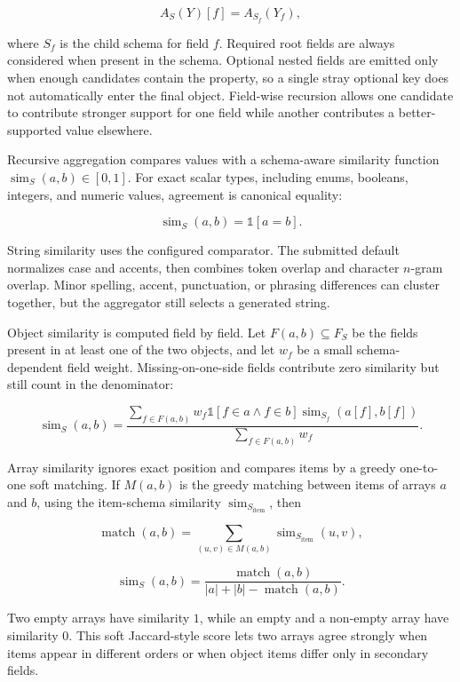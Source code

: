 \[
A_S(Y)[f]=A_{S_f}(Y_f),
\]

where \(S_f\) is the child schema for field \(f\). Required root fields are always considered when present in the schema. Optional nested fields are emitted only when enough candidates contain the property, so a single stray optional key does not automatically enter the final object. Field-wise recursion allows one candidate to contribute stronger support for one field while another contributes a better-supported value elsewhere.

Recursive aggregation compares values with a schema-aware similarity function \(\operatorname{sim}_S(a,b)\in[0,1]\). For exact scalar types, including enums, booleans, integers, and numeric values, agreement is canonical equality:

\[
\operatorname{sim}_S(a,b)=\mathbb{1}[a=b].
\]

String similarity uses the configured comparator. The submitted default normalizes case and accents, then combines token overlap and character \(n\)-gram overlap. Minor spelling, accent, punctuation, or phrasing differences can cluster together, but the aggregator still selects a generated string.

Object similarity is computed field by field. Let \(F(a,b)\subseteq F_S\) be the fields present in at least one of the two objects, and let \(w_f\) be a small schema-dependent field weight. Missing-on-one-side fields contribute zero similarity but still count in the denominator:

\[
\operatorname{sim}_S(a,b)=
\frac{
\sum_{f\in F(a,b)}
w_f\mathbb{1}[f\in a\land f\in b]\operatorname{sim}_{S_f}(a[f],b[f])
}{
\sum_{f\in F(a,b)}w_f
}.
\]

Array similarity ignores exact position and compares items by a greedy one-to-one soft matching. If \(M(a,b)\) is the greedy matching between items of arrays \(a\) and \(b\), using the item-schema similarity \(\operatorname{sim}_{S_{\mathrm{item}}}\), then

\[
\operatorname{match}(a,b)=
\sum_{(u,v)\in M(a,b)}\operatorname{sim}_{S_{\mathrm{item}}}(u,v),
\]

\[
\operatorname{sim}_S(a,b)=
\frac{\operatorname{match}(a,b)}
{|a|+|b|-\operatorname{match}(a,b)}.
\]

Two empty arrays have similarity \(1\), while an empty and a non-empty array have similarity \(0\). This soft Jaccard-style score lets two arrays agree strongly when items appear in different orders or when object items differ only in secondary fields.

